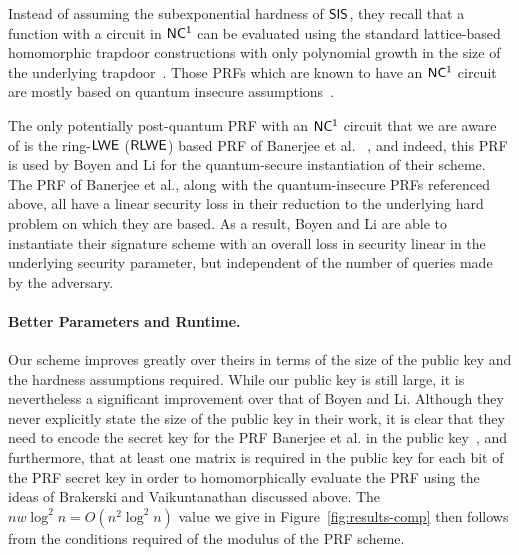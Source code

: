 Instead of assuming the subexponential hardness of $\mathsf{SIS}$, they recall that a function with a circuit in $\mathsf{NC^{1}}$  can be evaluated using the standard lattice-based homomorphic trapdoor constructions with only
polynomial growth in the size of the underlying
trapdoor~\cite{DBLP:conf/innovations/BrakerskiV14}. Those PRFs which are known to have an $\mathsf{NC^{1}}$ circuit are mostly based on quantum insecure  assumptions~\cite{DBLP:journals/jcss/NaorR99,DBLP:journals/siamcomp/NaorRR02}.

The only potentially post-quantum PRF with an $\mathsf{NC^{1}}$ circuit that we are aware of is the ring-$\mathsf{LWE}$ ($\mathsf{RLWE}$) based PRF of Banerjee et al.
~\cite{DBLP:conf/eurocrypt/BanerjeePR12}, and indeed, this PRF is used by Boyen and Li for the quantum-secure instantiation of their scheme.  The PRF of Banerjee et al., along with the quantum-insecure PRFs referenced above, all have a linear security loss in their reduction to the underlying hard problem on which they are based. As a result, Boyen and Li are able to instantiate their signature scheme with an overall loss in security linear in the underlying security parameter, but independent of the number of queries made by the adversary.



\paragraph{Better Parameters and Runtime.} Our scheme improves greatly over theirs in terms of the size of the public key and the hardness assumptions required.  While our public key is still large, it is nevertheless a significant improvement over that of Boyen and Li. Although they never explicitly state the size of the public key in their work, it is clear that they need to encode the secret key for the PRF Banerjee et al. in the public key~\cite{DBLP:conf/eurocrypt/BanerjeePR12}, and furthermore, that at least one matrix is required in the public key for each bit of the PRF secret key in order to homomorphically evaluate the PRF using the ideas of Brakerski and Vaikuntanathan discussed above. The $nw\log^2{n}=O(n^2\log^2{n})$ value we give in Figure~\ref{fig:results-comp} then follows from the conditions required of the modulus of the PRF scheme. 

